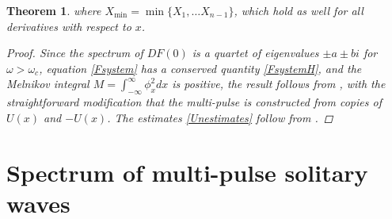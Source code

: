\documentclass[12pt]{elsarticle}
\newtheorem{theorem}{Theorem}
\begin{document}
\begin{theorem}
where $X_{\mathrm{min}} = \min \{ X_1, \dots X_{n-1} \}$, which hold as well for all derivatives with respect to $x$.
\begin{proof}
Since the spectrum of $DF(0)$ is a quartet of eigenvalues $\pm a \pm b i$ for $\omega > \omega_c$, equation \cref{Fsystem} has a conserved quantity \cref{FsystemH}, and the Melnikov integral $M = \int_{-\infty}^\infty \phi_x^2 dx$ is positive, the result follows from \cite[Theorem~3.6]{SandstedeStrut}, with the straightforward modification that the multi-pulse is constructed from copies of $U(x)$ and $-U(x)$. The estimates \cref{Unestimates} follow from \cite{Sandstede1993,Sandstede1998}.
\end{proof}
\end{theorem}

\section{Spectrum of multi-pulse solitary waves}\label{sec:multieig}
\end{document}
